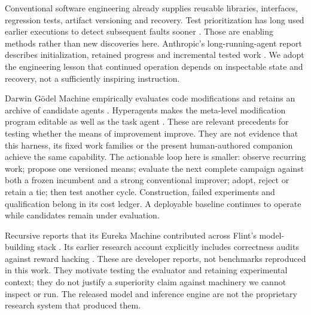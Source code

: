 \documentclass[11pt,letterpaper]{article}
\begin{document}
Conventional software engineering already supplies reusable libraries, interfaces, regression tests, artifact versioning and recovery. Test prioritization has long used earlier executions to detect subsequent faults sooner \cite{rothermel}. Those are enabling methods rather than new discoveries here. Anthropic's long-running-agent report describes initialization, retained progress and incremental tested work \cite{longharness}. We adopt the engineering lesson that continued operation depends on inspectable state and recovery, not a sufficiently inspiring instruction.

Darwin G\"odel Machine empirically evaluates code modifications and retains an archive of candidate agents \cite{dgm}. Hyperagents makes the meta-level modification program editable as well as the task agent \cite{hyperagents}. These are relevant precedents for testing whether the means of improvement improve. They are not evidence that this harness, its fixed work families or the present human-authored companion achieve the same capability. The actionable loop here is smaller: observe recurring work; propose one versioned means; evaluate the next complete campaign against both a frozen incumbent and a strong conventional improver; adopt, reject or retain a tie; then test another cycle. Construction, failed experiments and qualification belong in its cost ledger. A deployable baseline continues to operate while candidates remain under evaluation.

Recursive reports that its Eureka Machine contributed across Flint's model-building stack \cite{flint}. Its earlier research account explicitly includes correctness audits against reward hacking \cite{researchloop}. These are developer reports, not benchmarks reproduced in this work. They motivate testing the evaluator and retaining experimental context; they do not justify a superiority claim against machinery we cannot inspect or run. The released model and inference engine are not the proprietary research system that produced them.
\end{document}
